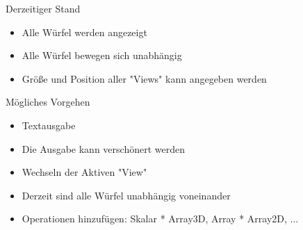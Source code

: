 \documentclass{../presentation}
\begin{document}
\frame[plain]{\titlepage}

\begin{frame}{Derzeitiger Stand}
    \begin{itemize}
        \item Alle Würfel werden angezeigt
        \item Alle Würfel bewegen sich unabhängig
        \item Größe und Position aller "Views" kann angegeben werden
    \end{itemize}
\end{frame}

\begin{frame}{Mögliches Vorgehen}
    \begin{itemize}
        \item Textausgabe
        \item Die Ausgabe kann verschönert werden
        \item Wechseln der Aktiven "View"
        \item Derzeit sind alle Würfel unabhängig voneinander
        \item Operationen hinzufügen: Skalar * Array3D, Array * Array2D, ...
    \end{itemize}
\end{frame}
\end{document}
